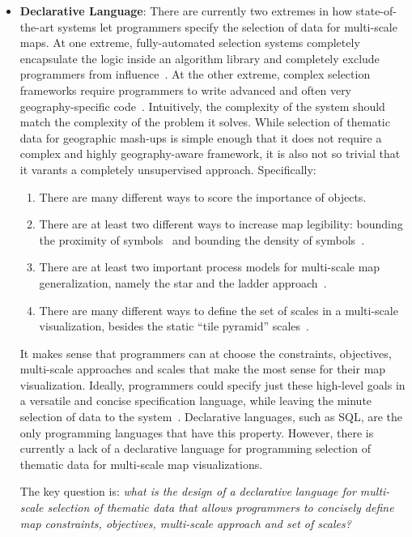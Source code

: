 \documentclass[11pt, oneside]{report}
\begin{document}
\begin{itemize}
\item \textbf{Declarative Language}: There are currently two extremes in how state-of-the-art systems let programmers specify the selection of data for multi-scale maps. At one extreme, fully-automated selection systems completely encapsulate the logic inside an algorithm library and completely exclude programmers from influence~\cite{sarma2012fusiontables, nutanong2012multiresolution}. At the other extreme, complex selection frameworks require programmers to write advanced and often very geography-specific code~\cite{ware2003generalization_sa,lamy1999application}. Intuitively, the complexity of the system should match the complexity of the problem it solves. While selection of thematic data for geographic mash-ups is simple enough that it does not require a complex and highly geography-aware framework, it is also not so trivial that it varants a completely unsupervised approach. Specifically:

\begin{enumerate}
\item There are many different ways to score the importance of objects.
\item There are at least two different ways to increase map legibility: bounding the proximity of symbols~\cite{nutanong2012multiresolution} and bounding the density of symbols~\cite{woodruff1998constant}.
\item There are at least two important process models for multi-scale map generalization, namely the star and the ladder approach~\cite{foerster2010challenges}. 
\item There are many different ways to define the set of scales in a multi-scale visualization, besides the static ``tile pyramid'' scales~\cite{mbtile12}.
\end{enumerate}

It makes sense that programmers can at choose the constraints, objectives, multi-scale approaches and scales that make the most sense for their map visualization. Ideally, programmers could specify just these high-level goals in a versatile and concise specification language, while leaving the minute selection of data to the system~\cite{meliou2011reverse}. Declarative languages, such as SQL, are the only programming languages that have this property. However, there is currently a lack of a declarative language for programming selection of thematic data for multi-scale map visualizations.

The key question is: \emph{what is the design of a declarative language for multi-scale selection of thematic data that allows programmers to concisely define map constraints, objectives, multi-scale approach and set of scales?}


\end{itemize}
\end{document}
